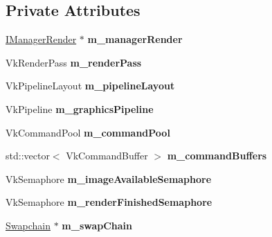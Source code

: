 \subsection*{Private Attributes}
\begin{DoxyCompactItemize}
\item 
\mbox{\label{class_flounder_1_1_renderer_a888da3b7806ff0b2c8b795274412d840}} 
\hyperlink{class_flounder_1_1_i_manager_render}{I\+Manager\+Render} $\ast$ {\bfseries m\+\_\+manager\+Render}
\item 
\mbox{\label{class_flounder_1_1_renderer_a80b6d768c8918e58943359f7d0dd27ec}} 
Vk\+Render\+Pass {\bfseries m\+\_\+render\+Pass}
\item 
\mbox{\label{class_flounder_1_1_renderer_a10ed4aec8c87451eb20535706eee6861}} 
Vk\+Pipeline\+Layout {\bfseries m\+\_\+pipeline\+Layout}
\item 
\mbox{\label{class_flounder_1_1_renderer_ae701b14d329b463c3a043716b818e130}} 
Vk\+Pipeline {\bfseries m\+\_\+graphics\+Pipeline}
\item 
\mbox{\label{class_flounder_1_1_renderer_a13fe5199cd051b12ca321adac0834ecb}} 
Vk\+Command\+Pool {\bfseries m\+\_\+command\+Pool}
\item 
\mbox{\label{class_flounder_1_1_renderer_aa91b409873289bc0cd4f23793c942e99}} 
std\+::vector$<$ Vk\+Command\+Buffer $>$ {\bfseries m\+\_\+command\+Buffers}
\item 
\mbox{\label{class_flounder_1_1_renderer_af7114b1b972ee526967bc41c3bf66912}} 
Vk\+Semaphore {\bfseries m\+\_\+image\+Available\+Semaphore}
\item 
\mbox{\label{class_flounder_1_1_renderer_aeff9c4e42939d275156b1a76ffee609d}} 
Vk\+Semaphore {\bfseries m\+\_\+render\+Finished\+Semaphore}
\item 
\mbox{\label{class_flounder_1_1_renderer_a962a098f743c73d52ac9f48cf8bef8b0}} 
\hyperlink{class_flounder_1_1_swapchain}{Swapchain} $\ast$ {\bfseries m\+\_\+swap\+Chain}

\end{DoxyCompactItemize}
